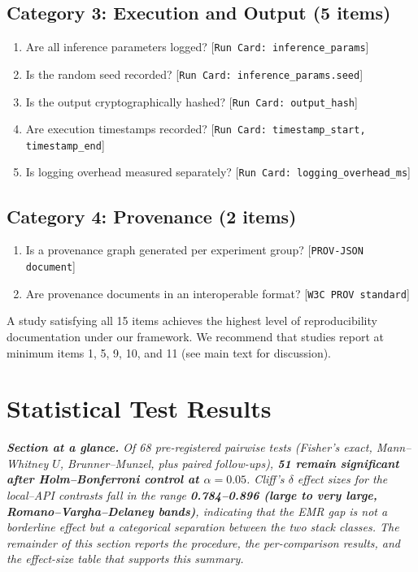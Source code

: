 \documentclass[11pt]{article}
\begin{document}
\subsection*{Category 3: Execution and Output (5 items)}
\begin{enumerate}[resume]
    \item Are all inference parameters logged?
    \hfill [\texttt{Run Card: inference\_params}]
    \item Is the random seed recorded?
    \hfill [\texttt{Run Card: inference\_params.seed}]
    \item Is the output cryptographically hashed?
    \hfill [\texttt{Run Card: output\_hash}]
    \item Are execution timestamps recorded?
    \hfill [\texttt{Run Card: timestamp\_start, timestamp\_end}]
    \item Is logging overhead measured separately?
    \hfill [\texttt{Run Card: logging\_overhead\_ms}]
\end{enumerate}

\subsection*{Category 4: Provenance (2 items)}
\begin{enumerate}[resume]
    \item Is a provenance graph generated per experiment group?
    \hfill [\texttt{PROV-JSON document}]
    \item Are provenance documents in an interoperable format?
    \hfill [\texttt{W3C PROV standard}]
\end{enumerate}

\noindent A study satisfying all 15 items achieves the highest level of reproducibility documentation under our framework. We recommend that studies report at minimum items 1, 5, 9, 10, and 11 (see main text for discussion).


\section{Statistical Test Results}
\label{sec:s9}

\textit{\textbf{Section at a glance.} Of 68 pre-registered pairwise tests (Fisher's exact, Mann--Whitney $U$, Brunner--Munzel, plus paired follow-ups), \textbf{51 remain significant after Holm--Bonferroni control at $\alpha=0.05$}. Cliff's $\delta$ effect sizes for the local--API contrasts fall in the range \textbf{0.784--0.896 (large to very large, Romano--Vargha--Delaney bands)}, indicating that the EMR gap is not a borderline effect but a categorical separation between the two stack classes. The remainder of this section reports the procedure, the per-comparison results, and the effect-size table that supports this summary.}
\end{document}
